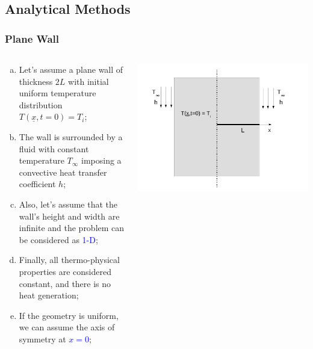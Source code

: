 \documentclass[10pt,compress]{beamer}
\newcommand{\blue}{\textcolor{blue}}
\begin{document}
\subsection{Analytical Methods}

\begin{frame}
 \frametitle{Plane Wall}
  \begin{columns}
    \begin{column}[l]{0.6\linewidth}
     \begin{enumerate}[(a)]%
        \item<1-> Let's assume a plane wall of thickness $2L$ with initial uniform temperature distribution $T\left(\underline{x},t=0\right)=T_{i}$;
        \item<1-> The wall is surrounded by a fluid with constant temperature $T_{\infty}$ imposing a convective heat transfer coefficient $h$;
        \item<1-> Also, let's assume that the wall's height and width are infinite and the problem can be considered as \blue{1-D};
        \item<1-> Finally, all thermo-physical properties are considered constant, and there is no heat generation;  
        \item<1-> If the geometry is uniform, we can assume the axis of symmetry at \blue{$x=0$};
     \end{enumerate}
    \end{column}
     \begin{column}[l]{0.4\linewidth}
        \begin{center}
          \includegraphics[width=1.1\columnwidth,height=1.3\columnwidth,clip]{./Pics/HT_PlaneWall}

\end{center}
\end{column}
\end{columns}
\end{frame}
\end{document}

